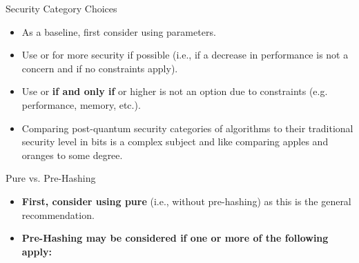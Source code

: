 \begin{minipage}[t]{0.28\textwidth}
    \vspace{0pt}
    \begin{algorithmbox}{Security Category Choices}
        \scriptsize
        \begin{itemize}[leftmargin=*]
            \setlength\itemsep{0em}
            \item As a baseline, first consider using \hspace{-3mm} parameters.\\
            \item Use \hspace{-3mm} or
            \hspace{-3mm} for more security if possible (i.e., if a decrease in performance is not a concern and if no constraints apply).\\
            \item Use \hspace{-3mm} or
            \hspace{-3mm} {\bfseries if and only if} \hspace{-3mm} or higher is not an option due to constraints (e.g. performance, memory, etc.).\\
            \item Comparing post-quantum security categories of algorithms to their traditional security level in bits is a complex subject and like comparing apples and oranges to some degree.
        \end{itemize}
    \end{algorithmbox}
    \vfill
    \begin{algorithmbox}{Pure vs. Pre-Hashing}
        \scriptsize
        \begin{itemize}[leftmargin=*]
            \setlength\itemsep{0em}
            \item {\bfseries First, consider using  pure} (i.e., without pre-hashing) as this is the general recommendation.\\
            \item {\bfseries Pre-Hashing may be considered if one or more of the following apply:}

\end{itemize}
\end{algorithmbox}
\end{minipage}
